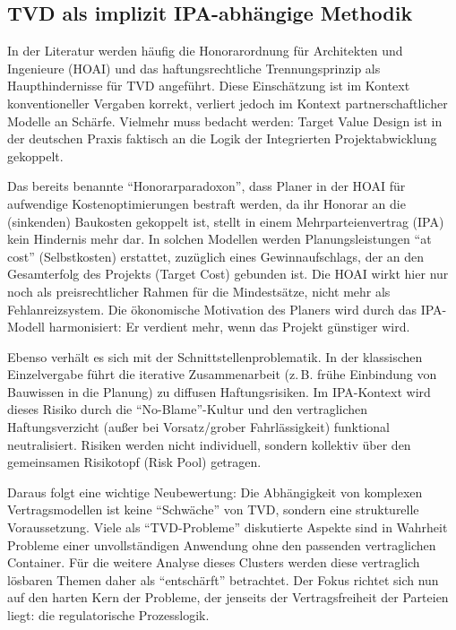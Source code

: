 \subsection{TVD als implizit IPA-abhängige Methodik}
\label{sec:5.3.1}

In der Literatur werden häufig die Honorarordnung für Architekten und Ingenieure (\acs{HOAI}) und das haftungsrechtliche Trennungsprinzip als Haupthindernisse für \acs{TVD} angeführt. Diese Einschätzung ist im Kontext konventioneller Vergaben korrekt, verliert jedoch im Kontext partnerschaftlicher Modelle an Schärfe. Vielmehr muss bedacht werden: Target Value Design ist in der deutschen Praxis faktisch an die Logik der Integrierten Projektabwicklung gekoppelt.

Das bereits benannte \enquote{Honorarparadoxon}, dass Planer in der \acs{HOAI} für aufwendige Kostenoptimierungen bestraft werden, da ihr Honorar an die (sinkenden) Baukosten gekoppelt ist, stellt in einem Mehrparteienvertrag (\acs{IPA}) kein Hindernis mehr dar. In solchen Modellen werden Planungsleistungen \enquote{at cost} (Selbstkosten) erstattet, zuzüglich eines Gewinnaufschlags, der an den Gesamterfolg des Projekts (Target Cost) gebunden ist.\autocite[Vgl.][S.~52]{becker_integrierte_2022} Die \acs{HOAI} wirkt hier nur noch als preisrechtlicher Rahmen für die Mindestsätze, nicht mehr als Fehlanreizsystem. Die ökonomische Motivation des Planers wird durch das \acs{IPA}-Modell harmonisiert: Er verdient mehr, wenn das Projekt günstiger wird.

Ebenso verhält es sich mit der Schnittstellenproblematik. In der klassischen Einzelvergabe führt die iterative Zusammenarbeit (z.\,B. frühe Einbindung von Bauwissen in die Planung) zu diffusen Haftungsrisiken. Im \acs{IPA}-Kontext wird dieses Risiko durch die \enquote{No-Blame}-Kultur und den vertraglichen Haftungsverzicht (außer bei Vorsatz/grober Fahrlässigkeit) funktional neutralisiert. Risiken werden nicht individuell, sondern kollektiv über den gemeinsamen Risikotopf (Risk Pool) getragen.

Daraus folgt eine wichtige Neubewertung: Die Abhängigkeit von komplexen Vertragsmodellen ist keine \enquote{Schwäche} von \acs{TVD}, sondern eine strukturelle Voraussetzung. Viele als \enquote{\acs{TVD}-Probleme} diskutierte Aspekte sind in Wahrheit Probleme einer unvollständigen Anwendung ohne den passenden vertraglichen Container. Für die weitere Analyse dieses Clusters werden diese vertraglich lösbaren Themen daher als \enquote{entschärft} betrachtet. Der Fokus richtet sich nun auf den harten Kern der Probleme, der jenseits der Vertragsfreiheit der Parteien liegt: die regulatorische Prozesslogik.

